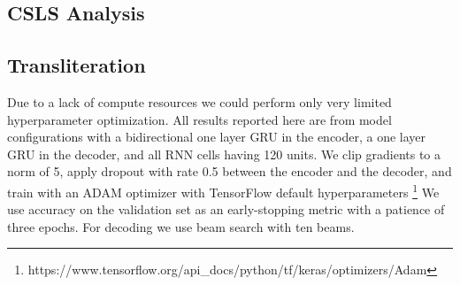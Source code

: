 \documentclass{article}
\begin{document}
%

\subsection*{CSLS Analysis}

\subsection*{Transliteration}

Due to a lack of compute resources we could perform
only very limited hyperparameter optimization.
All results reported here are from model configurations
with a bidirectional one layer GRU in the encoder,
a one layer GRU in the decoder,
and all RNN cells having 120 units.
We clip gradients to a norm of 5,
apply dropout with rate 0.5 between the encoder and the decoder,
and train with an ADAM optimizer with TensorFlow default hyperparameters
\footnote{https://www.tensorflow.org/api\_docs/python/tf/keras/optimizers/Adam}
We use accuracy on the validation set as an early-stopping metric
with a patience of three epochs.
For decoding we use beam search with ten beams.
\end{document}
